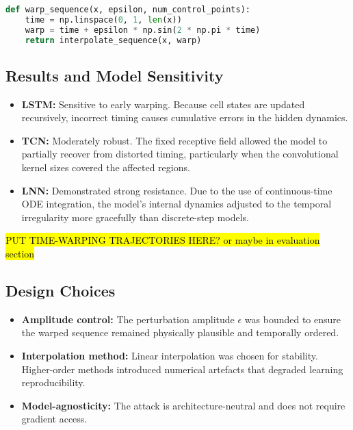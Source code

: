 \begin{lstlisting}[language=Python, caption={Example Time-Warping Attack Function}]
def warp_sequence(x, epsilon, num_control_points):
    time = np.linspace(0, 1, len(x))
    warp = time + epsilon * np.sin(2 * np.pi * time)
    return interpolate_sequence(x, warp)
\end{lstlisting}

\subsection{Results and Model Sensitivity}
\begin{itemize}
    \item \textbf{LSTM:} Sensitive to early warping. Because cell states are updated recursively, incorrect timing causes cumulative errors in the hidden dynamics.
    \item \textbf{TCN:} Moderately robust. The fixed receptive field allowed the model to partially recover from distorted timing, particularly when the convolutional kernel sizes covered the affected regions.
    \item \textbf{LNN:} Demonstrated strong resistance. Due to the use of continuous-time ODE integration, the model's internal dynamics adjusted to the temporal irregularity more gracefully than discrete-step models.
\end{itemize}

\hl{PUT TIME-WARPING TRAJECTORIES HERE? or maybe in evaluation section}



\subsection{Design Choices}
\begin{itemize}
    \item \textbf{Amplitude control:} The perturbation amplitude $\epsilon$ was bounded to ensure the warped sequence remained physically plausible and temporally ordered.
    \item \textbf{Interpolation method:} Linear interpolation was chosen for stability. Higher-order methods introduced numerical artefacts that degraded learning reproducibility.
    \item \textbf{Model-agnosticity:} The attack is architecture-neutral and does not require gradient access.
\end{itemize}

